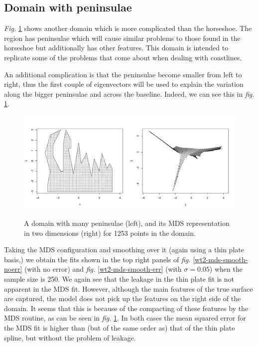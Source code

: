 \documentclass[a4paper,10pt]{article}
\newcommand{\fig}[1]{\emph{fig.} \ref{#1}}
\newcommand{\Fig}[1]{\emph{Fig.} \ref{#1}}
\begin{document}
\subsection{Domain with peninsulae}

\Fig{wt2dia} shows another domain which is more complicated than the horseshoe. The region has peninsulae which will cause similar problems to those found in the horseshoe but additionally has other features. This domain is intended to replicate some of the problems that come about when dealing with coastlines.

An additional complication is that the peninsulae become smaller from left to right, thus the first couple of eigenvectors will be used to explain the variation along the bigger peninsulae and across the baseline. Indeed, we can see this in \fig{wt2dia}.

\begin{figure}
\centering
\includegraphics[width=6in]{figs/wt2-mds.pdf}\\
\caption{A domain with many peninsulae (left), and its MDS representation in two dimensions (right) for 1253 points in the domain.}
\label{wt2dia}
\end{figure}

Taking the MDS configuration and smoothing over it (again using a thin plate basis,) we obtain the fits shown in the top right panels of \fig{wt2-mds-smooth-noerr} (with no error) and \fig{wt2-mds-smooth-err} (with $\sigma=0.05$) when the sample size is 250. We again see that the leakage in the thin plate fit is not apparent in the MDS fit. However, although the main features of the true surface are captured, the model does not pick up the features on the right side of the domain. It seems that this is because of the compacting of these features by the MDS routine, as can be seen in \fig{wt2dia}. In both cases the mean squared error for the MDS fit is higher than (but of the same order as) that of the thin plate spline, but without the problem of leakage.
\end{document}
